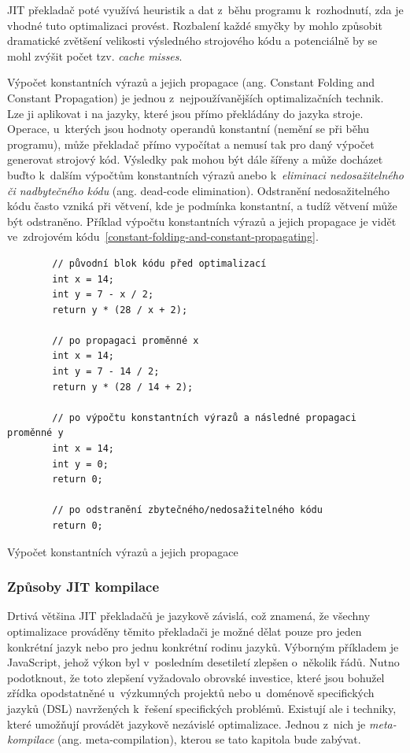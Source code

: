 \documentclass[
  master,
  biblatex,
  figures=true,
  theorems,
  sourcecodes,
  glossaries,
  index
]{kidiplom}
\begin{document}
JIT překladač poté využívá heuristik a dat z~běhu programu k~rozhodnutí, zda je vhodné tuto optimalizaci provést. Rozbalení každé smyčky by mohlo způsobit dramatické zvětšení velikosti výsledného strojového kódu a potenciálně by se mohl zvýšit počet tzv. \textit{cache misses}.



Výpočet konstantních výrazů a jejich propagace (ang. Constant Folding and Constant Propagation) je jednou z~nejpoužívanějších optimalizačních technik. Lze ji aplikovat i na jazyky, které jsou přímo překládány do jazyka stroje. Operace, u~kterých jsou hodnoty operandů konstantní (nemění se při běhu programu), může překladač přímo vypočítat a nemusí tak pro daný výpočet generovat strojový kód. Výsledky pak mohou být dále šířeny a může docházet buďto k~dalším výpočtům konstantních výrazů anebo k~\textit{eliminaci nedosažitelného či nadbytečného kódu} (ang. dead-code elimination). Odstranění nedosažitelného kódu často vzniká při větvení, kde je podmínka konstantní, a tudíž větvení může být odstraněno. Příklad výpočtu konstantních výrazů a jejich propagace je vidět ve~zdrojovém kódu~\ref{constant-folding-and-constant-propagating}. 

\begin{listing} [H]
    \begin{verbatim}
        // původní blok kódu před optimalizací
        int x = 14;
        int y = 7 - x / 2;
        return y * (28 / x + 2);
        
        // po propagaci proměnné x
        int x = 14;
        int y = 7 - 14 / 2;
        return y * (28 / 14 + 2);
        
        // po výpočtu konstantních výrazů a následné propagaci proměnné y
        int x = 14;
        int y = 0;
        return 0;
        
        // po odstranění zbytečného/nedosažitelného kódu
        return 0;
    \end{verbatim}
    \caption{Výpočet konstantních výrazů a jejich propagace}
    \label{constant-folding-and-constant-propagating}
\end{listing}


\subsubsection{Způsoby JIT kompilace}
\label{JIT-compilation-chapter}
Drtivá většina JIT překladačů je jazykově závislá, což znamená, že všechny optimalizace prováděny těmito překladači je možné dělat pouze pro jeden konkrétní jazyk nebo pro jednu konkrétní rodinu jazyků. Výborným příkladem je JavaScript, jehož výkon byl v~posledním desetiletí zlepšen o~několik řádů. Nutno podotknout, že toto zlepšení vyžadovalo obrovské investice, které jsou bohužel zřídka opodstatněné u~výzkumných projektů nebo u~doménově specifických jazyků (DSL) navržených k~řešení specifických problémů. Existují ale i techniky, které umožňují provádět jazykově nezávislé optimalizace. Jednou z~nich je \textit{meta-kompilace} (ang. meta-compilation), kterou se tato kapitola bude zabývat. 
\end{document}
